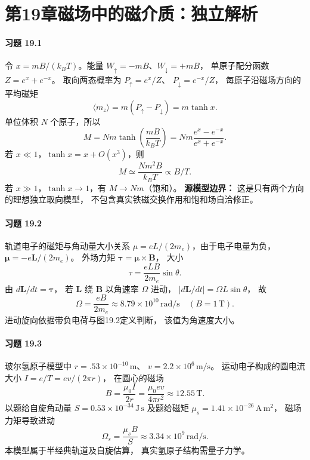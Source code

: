 \section*{第19章\quad 磁场中的磁介质：独立解析}

\paragraph{习题 19.1}
令 \(x=mB/(k_BT)\)。能量
\(W_\uparrow=-mB\)、\(W_\downarrow=+mB\)，
单原子配分函数 \(Z=e^x+e^{-x}\)。
取向两态概率为
\(P_\uparrow=e^x/Z\)、
\(P_\downarrow=e^{-x}/Z\)，
每原子沿磁场方向的平均磁矩
\[
 \langle m_z\rangle=m(P_\uparrow-P_\downarrow)
 =m\tanh x.
\]
单位体积 \(N\) 个原子，所以
\[
 \boxed{M=Nm\tanh\!\left(\frac{mB}{k_BT}\right)
 =Nm\frac{e^{x}-e^{-x}}{e^{x}+e^{-x}}}.
\]
若 \(x\ll1\)，\(\tanh x=x+O(x^3)\)，则
\[
 \boxed{M\simeq\frac{Nm^2B}{k_BT}\propto B/T}.
\]
若 \(x\gg1\)，\(\tanh x\to1\)，有
\(\boxed{M\to Nm}\)（饱和）。
\textbf{源模型边界：}
这是只有两个方向的理想独立取向模型，
不包含真实铁磁交换作用和饱和场自洽修正。

\paragraph{习题 19.2}
轨道电子的磁矩与角动量大小关系
\(\mu=eL/(2m_e)\)，由于电子电量为负，
\(\boldsymbol\mu=-e\boldsymbol L/(2m_e)\)。
外场力矩
\(\boldsymbol\tau=\boldsymbol\mu\times\boldsymbol B\)，
大小
\[
 \boxed{\tau=\frac{eLB}{2m_e}\sin\theta}.
\]
由 \(d\boldsymbol L/dt=\boldsymbol\tau\)，
若 \(\boldsymbol L\) 绕 \(\boldsymbol B\)
以角速率 \(\Omega\) 进动，
\(|d\boldsymbol L/dt|=\Omega L\sin\theta\)，
故
\[
 \boxed{\Omega=\frac{eB}{2m_e}
 \approx8.79\times10^{10}\,\mathrm{rad/s}
 \quad (B=1\,\mathrm T)}.
\]
进动旋向依据带负电荷与图19.2定义判断，
该值为角速度大小。

\paragraph{习题 19.3}
玻尔氢原子模型中
\(r=.53\times10^{-10}\,\mathrm m\)、
\(v=2.2\times10^6\,\mathrm{m/s}\)。
运动电子构成的圆电流大小
\(I=e/T=ev/(2\pi r)\)，
在圆心的磁场
\[
 \boxed{B=\frac{\mu_0I}{2r}
 =\frac{\mu_0ev}{4\pi r^2}
 \approx12.55\,\mathrm T}.
\]
以题给自旋角动量
\(S=0.53\times10^{-34}\,\mathrm{J\,s}\)
及题给磁矩
\(\mu_s=1.41\times10^{-26}\,\mathrm{A\,m^2}\)，
磁场力矩导致进动
\[
 \boxed{\Omega_s=\frac{\mu_s B}{S}
 \approx3.34\times10^9\,\mathrm{rad/s}}.
\]
本模型属于半经典轨道及自旋估算，
真实氢原子结构需量子力学。

